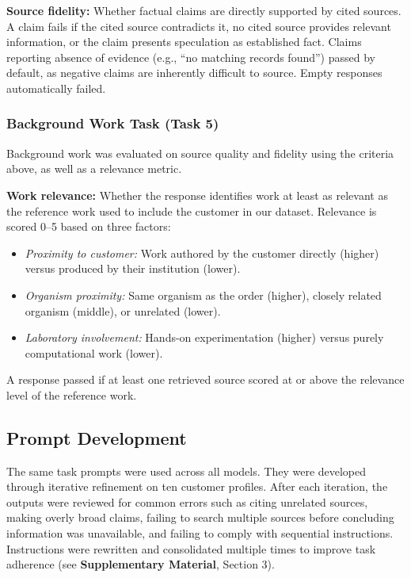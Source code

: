 \documentclass[utf8]{FrontiersinHarvard}
\begin{document}
\textbf{Source fidelity:} Whether factual claims are directly supported by cited sources. A claim fails if the cited source contradicts it, no cited source provides relevant information, or the claim presents speculation as established fact. Claims reporting absence of evidence (e.g., ``no matching records found'') passed by default, as negative claims are inherently difficult to source. Empty responses automatically failed.

\subsubsection{Background Work Task (Task 5)}

Background work was evaluated on source quality and fidelity using the criteria above, as well as a relevance metric.

\textbf{Work relevance:} Whether the response identifies work at least as relevant as the reference work used to include the customer in our dataset. Relevance is scored 0--5 based on three factors:

\begin{itemize}
\item \textit{Proximity to customer:} Work authored by the customer directly (higher) versus produced by their institution (lower).
\item \textit{Organism proximity:} Same organism as the order (higher), closely related organism (middle), or unrelated (lower).
\item \textit{Laboratory involvement:} Hands-on experimentation (higher) versus purely computational work (lower).
\end{itemize}

A response passed if at least one retrieved source scored at or above the relevance level of the reference work.

\subsection{Prompt Development}

The same task prompts were used across all models. They were developed through iterative refinement on ten customer profiles. After each iteration, the outputs were reviewed for common errors such as citing unrelated sources, making overly broad claims, failing to search multiple sources before concluding information was unavailable, and failing to comply with sequential instructions. Instructions were rewritten and consolidated multiple times to improve task adherence (see \textbf{Supplementary Material}, Section 3).
\end{document}

